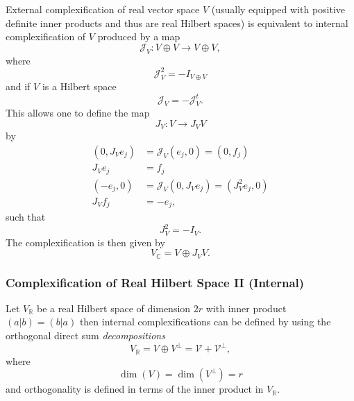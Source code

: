 \documentclass[aps,preprint]{revtex4}
\begin{document}
External complexification of real vector space $V$ (usually equipped with
positive definite inner products and thus are real Hilbert spaces) is
equivalent to internal complexification of $V$ produced by a map 
\begin{equation}
\mathcal{J}_{V}:V\oplus V\rightarrow V\oplus V,
\end{equation}%
where 
\begin{equation}
\mathcal{J}_{V}^{2}=-I_{V\oplus V}
\end{equation}%
and if $V$ is a Hilbert space 
\begin{equation}
\mathcal{J}_{V}=-\mathcal{J}_{V}^{t}.
\end{equation}%
This allows one to define the map 
\begin{equation}
J_{V}:V\rightarrow J_{V}V
\end{equation}%
by 
\begin{align}
\left( 0,J_{V}e_{j}\right) & =\mathcal{J}_{V}\left( e_{j},0\right) =\left(
0,f_{j}\right) \\
J_{V}e_{j}& =f_{j} \\
\left( -e_{j},0\right) & =\mathcal{J}_{V}\left( 0,J_{V}e_{j}\right) =\left(
J_{V}^{2}e_{j},0\right) \\
J_{V}f_{j}& =-e_{j},
\end{align}%
such that 
\begin{equation}
J_{V}^{2}=-I_{V}.
\end{equation}%
The complexification is then given by 
\begin{equation}
V_{\mathbb{C}}=V\oplus J_{V}V.
\end{equation}

\subsubsection{Complexification of Real Hilbert Space II (Internal)}

Let $V_{\mathbb{R}}$ be a real Hilbert space of dimension $2r$ with inner
product $\left( \left. a\right\vert b\right) =\left( \left. b\right\vert
a\right) $ then internal complexifications can be defined by using the
orthogonal direct sum \emph{decompositions} 
\begin{equation}
V_{\mathbb{R}}=V\oplus V^{\bot}=\mathcal{V}+\mathcal{V^{\bot}},
\end{equation}
where 
\begin{equation}
\dim\left( V\right) =\dim\left( V^{\bot}\right) =r
\end{equation}
and orthogonality is defined in terms of the inner product in $V_{\mathbb{R}%
}.$
\end{document}
